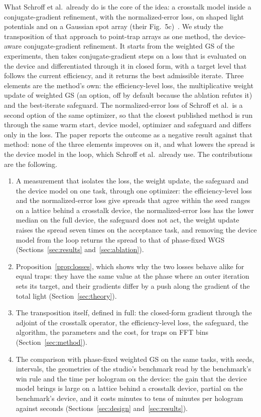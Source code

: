 What Schroff et al.\ already do is the core of the idea: a crosstalk model inside a conjugate-gradient refinement, with the normalized-error loss, on shaped light potentials and on a Gaussian spot array (their Fig.~5c)~\cite{schroff}. We study the transposition of that approach to point-trap arrays as one method, the device-aware conjugate-gradient refinement. It starts from the weighted GS of the experiments, then takes conjugate-gradient steps on a loss that is evaluated on the device and differentiated through it in closed form, with a target level that follows the current efficiency, and it returns the best admissible iterate. Three elements are the method's own: the efficiency-level loss, the multiplicative weight update of weighted GS (an option, off by default because the ablation refutes it) and the best-iterate safeguard. The normalized-error loss of Schroff et al.\ is a second option of the same optimizer, so that the closest published method is run through the same warm start, device model, optimizer and safeguard and differs only in the loss. The paper reports the outcome as a negative result against that method: none of the three elements improves on it, and what lowers the spread is the device model in the loop, which Schroff et al.\ already use. The contributions are the following.
\begin{enumerate}
\item A measurement that isolates the loss, the weight update, the safeguard and the device model on one task, through one optimizer: the efficiency-level loss and the normalized-error loss give spreads that agree within the seed ranges on a lattice behind a crosstalk device, the normalized-error loss has the lower median on the full device, the safeguard does not act, the weight update raises the spread seven times on the acceptance task, and removing the device model from the loop returns the spread to that of phase-fixed WGS (Sections~\ref{sec:results} and~\ref{sec:ablation}).
\item Proposition~\ref{prop:losses}, which shows why the two losses behave alike for equal traps: they have the same value at the phase where an outer iteration sets its target, and their gradients differ by a push along the gradient of the total light (Section~\ref{sec:theory}).
\item The transposition itself, defined in full: the closed-form gradient through the adjoint of the crosstalk operator, the efficiency-level loss, the safeguard, the algorithm, the parameters and the cost, for traps on FFT bins (Section~\ref{sec:method}).
\item The comparison with phase-fixed weighted GS on the same tasks, with seeds, intervals, the geometries of the studio's benchmark read by the benchmark's win rule and the time per hologram on the device: the gain that the device model brings is large on a lattice behind a crosstalk device, partial on the benchmark's device, and it costs minutes to tens of minutes per hologram against seconds (Sections~\ref{sec:design} and~\ref{sec:results}).
\end{enumerate}
